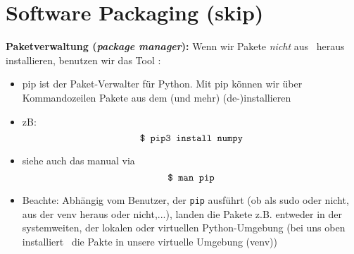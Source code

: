 \section{Software Packaging (skip)}

\textbf{Paketverwaltung (\textit{package manager}):}  Wenn wir Pakete \textit{nicht} aus \pycharm~heraus installieren, benutzen wir das Tool :
\begin{itemize}
	\item pip ist der Paket-Verwalter für Python. Mit pip können wir über Kommandozeilen Pakete aus dem  (und mehr) (de-)installieren
	\item zB: $$\texttt{\$ pip3 install numpy}$$
	\item siehe auch das manual via $$\texttt{\$ man pip}$$
	\item Beachte: Abhängig vom Benutzer, der \texttt{pip} ausführt (ob als sudo oder nicht, aus der venv heraus oder nicht,...), landen die Pakete z.B. entweder in der systemweiten, der lokalen oder virtuellen Python-Umgebung (bei uns oben installiert \pycharm~die Pakte in unsere virtuelle Umgebung (venv))
\end{itemize}
